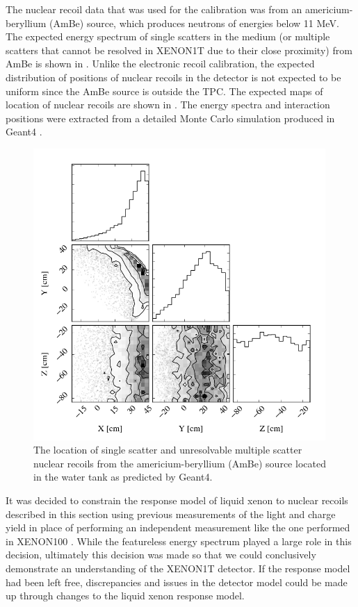 The nuclear recoil data that was used for the calibration was from an americium-beryllium (AmBe) source, which produces neutrons of energies below 11 MeV.  The expected energy spectrum of single scatters in the medium (or multiple scatters that cannot be resolved in XENON1T due to their close proximity) from AmBe is shown in .  Unlike the electronic recoil calibration, the expected distribution of positions of nuclear recoils in the detector is not expected to be uniform since the AmBe source is outside the TPC.  The expected maps of location of nuclear recoils are shown in .  The energy spectra and interaction positions were extracted from a detailed Monte Carlo simulation produced in Geant4 \cite{agostinelli2003geant4}.



\begin{figure}[t]
        \centering
	\includegraphics[width=0.99\textwidth]{xe1t_nr_positions}
	\caption{The location of single scatter and unresolvable multiple scatter nuclear recoils from the americium-beryllium (AmBe) source located in the water tank as predicted by Geant4.}
	\label{fig:xe1t_nr_positions}
\end{figure}


It was decided to constrain the response model of liquid xenon to nuclear recoils described in this section using previous measurements of the light and charge yield in place of performing an independent measurement like the one performed in XENON100 \cite{aprile2013response}.  While the featureless energy spectrum played a large role in this decision, ultimately this decision was made so that we could conclusively demonstrate an understanding of the XENON1T detector.  If the response model had been left free, discrepancies and issues in the detector model could be made up through changes to the liquid xenon response model.  

